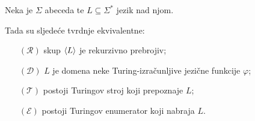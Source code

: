 \begin{teorem}[{name=[teorem ekvivalencije za poluodlučive jezike]}]
Neka je $\Sigma$ abeceda te $L\subseteq\Sigma^*$ jezik nad njom.

Tada su sljedeće tvrdnje ekvivalentne:
\begin{enumerate}
    \item[$(\mathcal R)$] skup $\langle L\rangle$ je rekurzivno prebrojiv;
    \item[$(\mathcal D)$] $L$ je domena neke Turing-izračunljive jezične funkcije $\varphi$;
    \item[$(\mathcal T)$] postoji Turingov stroj koji prepoznaje $L$;
    \item[$(\mathcal E)$] postoji Turingov enumerator koji nabraja $L$.
\end{enumerate}
\end{teorem}
